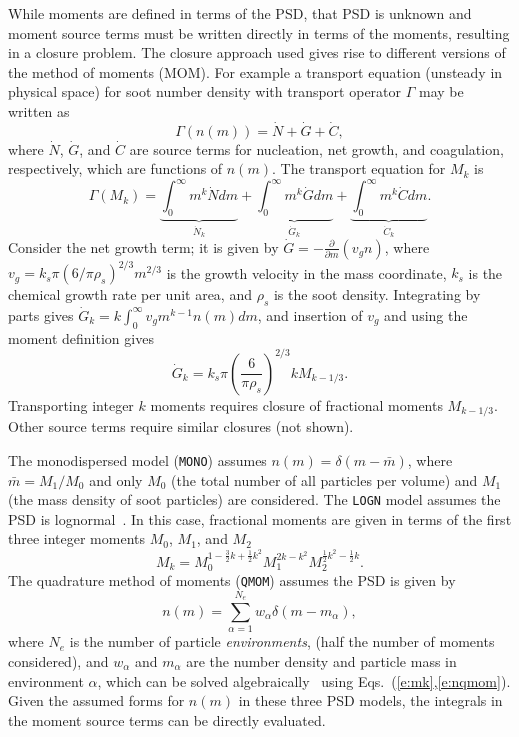 \documentclass[preprint,letterpaper]{elsarticle}
\newcommand{\prtl}[2]{\frac{\partial #1}{\partial #2}}
\begin{document}
While moments are defined in terms of the PSD, that PSD is unknown and moment source terms must be written directly in terms of the moments, resulting in a closure problem. The closure approach used gives rise to different versions of the method of moments (MOM). For example a transport equation (unsteady in physical space) for soot number density with transport operator $\Gamma$ may be written
as
%
\begin{equation}
    \Gamma(n(m)) = \dot{N} + \dot{G} + \dot{C},
\end{equation}
%
where $\dot{N}$, $\dot{G}$, and $\dot{C}$ are source terms for nucleation, net growth, and coagulation, respectively, which are functions of $n(m)$. The transport equation for $M_k$ is 
%
\begin{equation}
    \Gamma(M_k) = \underbrace{\int_0^\infty m^k\dot{N}dm}_{\dot{N}_k} + 
    \underbrace{\int_0^\infty m^k\dot{G}dm}_{\dot{G}_k}+ 
    \underbrace{\int_0^\infty m^k\dot{C}dm}_{\dot{C}_k}.
\end{equation}
%
Consider the net growth term; it is given by $\dot{G} = -\prtl{ }{m}(v_gn)$, where $v_g=k_s\pi(6/\pi\rho_s)^{2/3}m^{2/3}$ is the growth velocity in the mass coordinate, $k_s$ is the chemical growth rate per unit area, and $\rho_s$ is the soot density. Integrating by parts gives $\dot{G}_k=k\int_0^\infty v_gm^{k-1}n(m)dm$, and insertion of $v_g$ and using the moment definition gives
%
\begin{equation}
    \dot{G}_k = k_s\pi\left(\frac{6}{\pi \rho_s}\right)^{2/3}kM_{k-1/3}.
\end{equation}
%
Transporting integer $k$ moments requires closure of fractional moments $M_{k-1/3}$. Other source terms require similar closures (not shown).

The monodispersed model (\texttt{MONO}) assumes $n(m)=\delta(m-\bar{m})$, where $\bar{m}=M_1/M_0$ and only $M_0$ (the total number of all particles per volume) and $M_1$ (the mass density of soot particles) are considered. The \texttt{LOGN} model assumes the PSD is lognormal~\cite{Pratsinis_1988}. In this case, fractional moments are given in terms of the first three integer moments $M_0$, $M_1$, and $M_2$~\cite{Lignell_2008b}
%
\begin{equation}
    M_k = M_0^{1-\frac{3}{2}k+\frac{1}{2}k^2} M_1^{2k-k^2} M_2^{\frac{1}{2}k^2-\frac{1}{2}k}.
\end{equation}
%
The quadrature method of moments (\texttt{QMOM}) assumes the PSD is given by
%
\begin{equation} \label{e:nqmom}
    n(m) = \sum_{\alpha=1}^{N_e}w_\alpha\delta(m-m_\alpha),
\end{equation}
%
where $N_e$ is the number of particle \emph{environments}, (half the number of moments considered), and $w_\alpha$ and $m_\alpha$ are the number density and particle mass in environment $\alpha$, which can be solved algebraically~\cite{Wheeler_1974, Marchisio_2013} using Eqs.~(\ref{e:mk},\ref{e:nqmom}). Given the assumed forms for $n(m)$ in these three PSD models, the integrals in the moment source terms can be directly evaluated.
\end{document}
